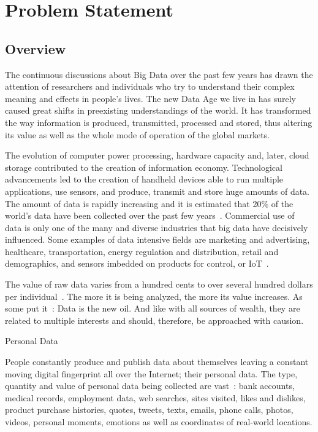 \chapter{Problem Statement}
\label{problem}

\section{Overview}
\label{problem:overview}

The continuous discussions about Big Data over the past few years has drawn the attention of researchers and individuals who try to understand their complex meaning and effects in people's lives. The new Data Age we live in has surely caused great shifts in preexisting understandings of the world.  It has transformed the way information is produced, transmitted, processed and stored, thus altering its value as well as the whole mode of operation of the global markets.

The evolution of computer power processing, hardware capacity and, later,  cloud storage contributed to the creation of information economy. Technological advancements led to the creation of handheld devices able to run multiple applications, use sensors, and produce, transmit and store huge amounts of data. The amount of data is rapidly increasing and it is estimated that 20\% of the world's data have been collected over the past few years~\cite{10.1109/SPW.2015.27,big_data_better_worse}. Commercial use of data is only one of the many and diverse industries that big data have decisively influenced. Some examples of data intensive fields are marketing and advertising, healthcare, transportation, energy regulation and distribution, retail and demographics, and sensors  imbedded on products for control, or IoT~\cite{big_data}.

The value of raw data varies from a hundred cents to over several hundred dollars per individual~\cite{pr_data_cost_1, pr_data_cost_2, pr_data_cost_3}. The more it is being analyzed, the more its value increases. As some put it~\cite{data_new_oil_01,data_new_oil_02,data_new_oil_03,data_new_oil_04,data_new_oil_05,data_new_oil_05,data_new_oil_06,data_new_oil_07,data_new_oil_08,data_new_oil_09}: Data is the new oil. And like with all sources of wealth, they are related to multiple interests and should, therefore, be approached with causion.

Personal Data

People constantly produce and publish data about themselves
leaving a constant moving digital fingerprint all over the Internet; their personal data. The type, quantity and value of personal data being collected are vast~\cite{emergence_new_assets_wef}: bank accounts, medical records, employment data, web searches, sites visited,
likes and dislikes, product purchase histories, quotes, tweets, texts, emails, phone calls, photos, videos, personal moments, emotions as well as coordinates of real-world locations.

